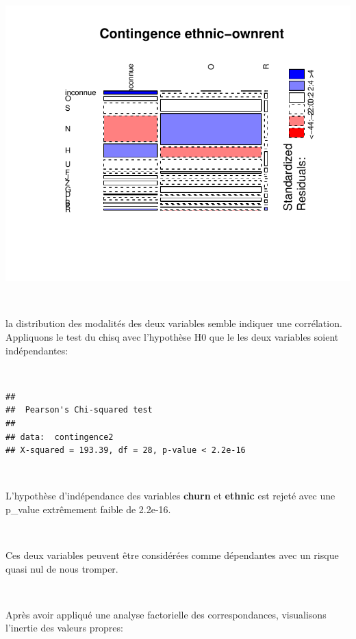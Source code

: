 \documentclass[]{imsart}
\numberwithin{equation}{section}
\theoremstyle{plain}
\begin{document}
\begin{flushleft}\includegraphics{Analyse_Exploratoire_Projet_files/figure-latex/unnamed-chunk-25-1} \end{flushleft}

~

la distribution des modalités des deux variables semble indiquer une corrélation. Appliquons le test du chisq avec l'hypothèse H0 que le les deux variables soient indépendantes:

~

\begin{verbatim}
## 
##  Pearson's Chi-squared test
## 
## data:  contingence2
## X-squared = 193.39, df = 28, p-value < 2.2e-16
\end{verbatim}

~

L'hypothèse d'indépendance des variables \textbf{churn} et \textbf{ethnic} est rejeté avec une p\_value extrêmement faible de 2.2e-16.

~

Ces deux variables peuvent être considérées comme dépendantes avec un risque quasi nul de nous tromper.

~

Après avoir appliqué une analyse factorielle des correspondances, visualisons l'inertie des valeurs propres:

~
\end{document}
